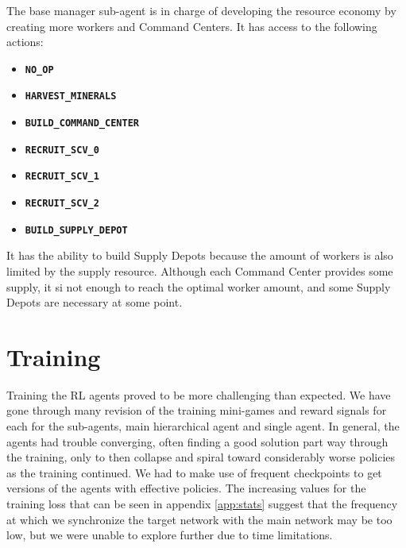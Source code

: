 The base manager sub-agent is in charge of developing the resource economy by creating more workers and Command Centers. It has access to the following actions:

\begin{multicols}{2}
\begin{itemize}
    \item \textbf{\texttt{NO\_OP}}
    \item \textbf{\texttt{HARVEST\_MINERALS}}
    \item \textbf{\texttt{BUILD\_COMMAND\_CENTER}}
    \item \textbf{\texttt{RECRUIT\_SCV\_0}}
    \item \textbf{\texttt{RECRUIT\_SCV\_1}}
    \item \textbf{\texttt{RECRUIT\_SCV\_2}}
    \item \textbf{\texttt{BUILD\_SUPPLY\_DEPOT}}
\end{itemize}
\end{multicols}

It has the ability to build Supply Depots because the amount of workers is also limited by the supply resource. Although each Command Center provides some supply, it si not enough to reach the optimal worker amount, and some Supply Depots are necessary at some point.

\section{Training}
\label{sec:training}

Training the RL agents proved to be more challenging than expected. We have gone through many revision of the training mini-games and reward signals for each for the sub-agents, main hierarchical agent and single agent. In general, the agents had trouble converging, often finding a good solution part way through the training, only to then collapse and spiral toward considerably worse policies as the training continued. We had to make use of frequent checkpoints to get versions of the agents with effective policies. The increasing values for the training loss that can be seen in appendix \ref{app:stats} suggest that the frequency at which we synchronize the target network with the main network may be too low, but we were unable to explore further due to time limitations.

